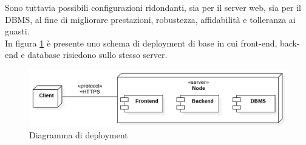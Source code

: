 \documentclass[11pt]{report}
\begin{document}
Sono tuttavia possibili configurazioni ridondanti, sia per il server web, sia per il DBMS, al fine di migliorare prestazioni, robustezza, affidabilità e tolleranza ai guasti.
\\In figura \ref{deployment_diagram} è presente uno schema di deployment di base in cui front-end, back-end e database risiedono sullo stesso server.
\begin{figure}
	\centering
	\includegraphics[scale=0.45]{DeploymentDiagram}
	\caption{Diagramma di deployment \label{deployment_diagram}}
\end{figure}
\pagebreak
\end{document}
